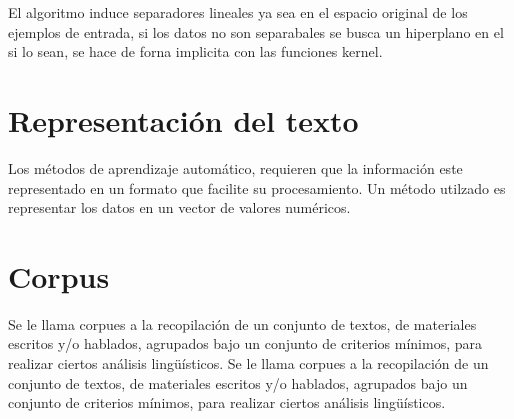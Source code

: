 	El algoritmo induce separadores lineales ya sea en el espacio original de los ejemplos 
	de entrada, si los datos no son separabales se busca un hiperplano en el si lo sean, se hace de 
	forna implicita con las funciones kernel.

\section{Representación del texto}
	Los métodos de aprendizaje automático, requieren que la información este representado 
	en un formato que facilite su procesamiento. Un método utilzado es representar los datos
	en un vector de valores numéricos.


\section{Corpus}

Se le llama corpues a la recopilación de un conjunto de textos, de materiales escritos y/o hablados, agrupados bajo un conjunto de criterios mínimos, para realizar ciertos análisis lingüísticos.
Se le llama corpues a la recopilación de un conjunto de textos, de materiales escritos y/o hablados, agrupados bajo un conjunto de criterios mínimos, para realizar ciertos análisis lingüísticos.


